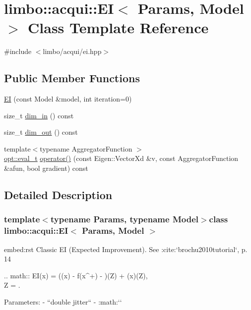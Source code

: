 \hypertarget{classlimbo_1_1acqui_1_1_e_i}{}\section{limbo\+:\+:acqui\+:\+:E\+I$<$ Params, Model $>$ Class Template Reference}
\label{classlimbo_1_1acqui_1_1_e_i}


{\ttfamily \#include $<$limbo/acqui/ei.\+hpp$>$}

\subsection*{Public Member Functions}
\begin{DoxyCompactItemize}
\item 
\hyperlink{classlimbo_1_1acqui_1_1_e_i_aa1e8c3ae70c75d10adf188e0c260a03a}{E\+I} (const Model \&model, int iteration=0)
\item 
size\+\_\+t \hyperlink{classlimbo_1_1acqui_1_1_e_i_a52d965602aa60609e3f4f447dbea285b}{dim\+\_\+in} () const 
\item 
size\+\_\+t \hyperlink{classlimbo_1_1acqui_1_1_e_i_a7b030343c6dae9af80853cfab0868e8d}{dim\+\_\+out} () const 
\item 
{\footnotesize template$<$typename Aggregator\+Function $>$ }\\\hyperlink{group__opt__tools_ga7fc87080ebf563d050fc547d25528ef0}{opt\+::eval\+\_\+t} \hyperlink{classlimbo_1_1acqui_1_1_e_i_a0ed3ce84deb35f7f00e5550f7ce502fc}{operator()} (const Eigen\+::\+Vector\+Xd \&v, const Aggregator\+Function \&afun, bool gradient) const 
\end{DoxyCompactItemize}


\subsection{Detailed Description}
\subsubsection*{template$<$typename Params, typename Model$>$class limbo\+::acqui\+::\+E\+I$<$ Params, Model $>$}

\begin{DoxyVerb}embed:rst
Classic EI (Expected Improvement). See :cite:`brochu2010tutorial`, p. 14

  .. math::
    EI(x) = (\mu(x) - f(x^+) - \xi)\Phi(Z) + \sigma(x)\phi(Z),\\ Z = .

Parameters:
  - ``double jitter`` - :math:`\xi`
\end{DoxyVerb}
 

